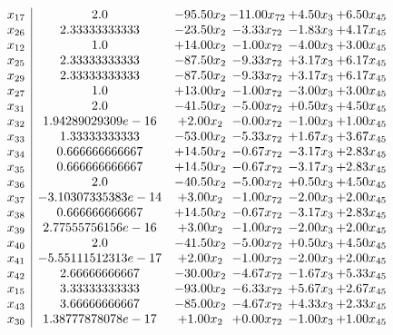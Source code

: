 \documentclass[8pt]{article}
\begin{document}
\[\begin{array}{c| c c@{\hskip 2pt} c@{\hskip 2pt} c@{\hskip 2pt} c@{\hskip 2pt} }
 x_{17}   &  2.0 & -95.50 x_{2} & -11.00 x_{72} & +  4.50 x_{3} & +  6.50 x_{45}\\
 x_{26}   &  2.33333333333 & -23.50 x_{2} & -3.33 x_{72} & -1.83 x_{3} & +  4.17 x_{45}\\
 x_{12}   &  1.0 & + 14.00 x_{2} & -1.00 x_{72} & -4.00 x_{3} & +  3.00 x_{45}\\
 x_{25}   &  2.33333333333 & -87.50 x_{2} & -9.33 x_{72} & +  3.17 x_{3} & +  6.17 x_{45}\\
 x_{29}   &  2.33333333333 & -87.50 x_{2} & -9.33 x_{72} & +  3.17 x_{3} & +  6.17 x_{45}\\
 x_{27}   &  1.0 & + 13.00 x_{2} & -1.00 x_{72} & -3.00 x_{3} & +  3.00 x_{45}\\
 x_{31}   &  2.0 & -41.50 x_{2} & -5.00 x_{72} & +  0.50 x_{3} & +  4.50 x_{45}\\
 x_{32}   &  1.94289029309e-16 & +  2.00 x_{2} & -0.00 x_{72} & -1.00 x_{3} & +  1.00 x_{45}\\
 x_{33}   &  1.33333333333 & -53.00 x_{2} & -5.33 x_{72} & +  1.67 x_{3} & +  3.67 x_{45}\\
 x_{34}   &  0.666666666667 & + 14.50 x_{2} & -0.67 x_{72} & -3.17 x_{3} & +  2.83 x_{45}\\
 x_{35}   &  0.666666666667 & + 14.50 x_{2} & -0.67 x_{72} & -3.17 x_{3} & +  2.83 x_{45}\\
 x_{36}   &  2.0 & -40.50 x_{2} & -5.00 x_{72} & +  0.50 x_{3} & +  4.50 x_{45}\\
 x_{37}   &  -3.10307335383e-14 & +  3.00 x_{2} & -1.00 x_{72} & -2.00 x_{3} & +  2.00 x_{45}\\
 x_{38}   &  0.666666666667 & + 14.50 x_{2} & -0.67 x_{72} & -3.17 x_{3} & +  2.83 x_{45}\\
 x_{39}   &  2.77555756156e-16 & +  3.00 x_{2} & -1.00 x_{72} & -2.00 x_{3} & +  2.00 x_{45}\\
 x_{40}   &  2.0 & -41.50 x_{2} & -5.00 x_{72} & +  0.50 x_{3} & +  4.50 x_{45}\\
 x_{41}   &  -5.55111512313e-17 & +  2.00 x_{2} & -1.00 x_{72} & -2.00 x_{3} & +  2.00 x_{45}\\
 x_{42}   &  2.66666666667 & -30.00 x_{2} & -4.67 x_{72} & -1.67 x_{3} & +  5.33 x_{45}\\
 x_{15}   &  3.33333333333 & -93.00 x_{2} & -6.33 x_{72} & +  5.67 x_{3} & +  2.67 x_{45}\\
 x_{43}   &  3.66666666667 & -85.00 x_{2} & -4.67 x_{72} & +  4.33 x_{3} & +  2.33 x_{45}\\
 x_{30}   &  1.38777878078e-17 & +  1.00 x_{2} & +  0.00 x_{72} & -1.00 x_{3} & +  1.00 x_{45}\\

\end{array}\]
\end{document}
